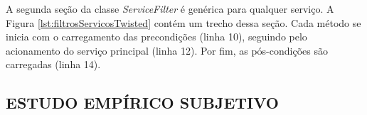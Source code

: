
A segunda seção da classe \emph{ServiceFilter} é genérica para
qualquer serviço. A Figura \ref{lst:filtrosServicosTwisted} contém um trecho
dessa seção. Cada método se inicia com o carregamento das precondições (linha
10), seguindo pelo acionamento do serviço principal (linha 12). Por fim,
as pós-condições são carregadas (linha 14).

\subsection{ESTUDO EMPÍRICO SUBJETIVO} 
\label{analiseSubjetiva}

% 
% 

